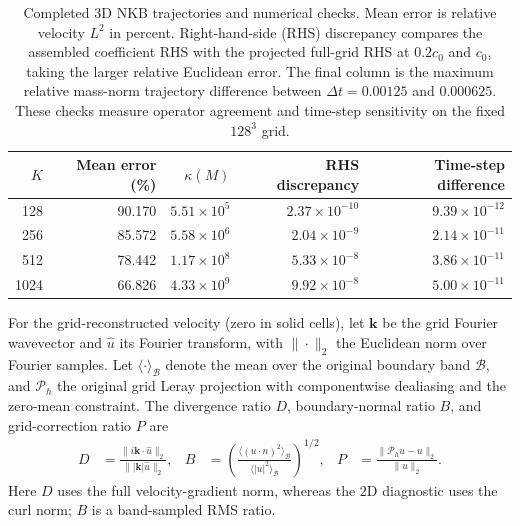 \begin{table}[!htb]
\centering\small
\caption{Completed 3D NKB trajectories and numerical checks. Mean error is relative velocity $L^2$ in percent. Right-hand-side (RHS) discrepancy compares the assembled coefficient RHS with the projected full-grid RHS at $0.2c_0$ and $c_0$, taking the larger relative Euclidean error. The final column is the maximum relative mass-norm trajectory difference between $\Delta t=0.00125$ and $0.000625$. These checks measure operator agreement and time-step sensitivity on the fixed $128^3$ grid.}
\label{tab:nkb-3d-checks}
\begin{tabular}{rrrrr}\toprule
$K$&Mean error (\%)&$\kappa(M)$&RHS discrepancy&Time-step difference\\\midrule
128&90.170&$5.51\times10^{5}$&$2.37\times10^{-10}$&$9.39\times10^{-12}$\\
256&85.572&$5.58\times10^{6}$&$2.04\times10^{-9}$&$2.14\times10^{-11}$\\
512&78.442&$1.17\times10^{8}$&$5.33\times10^{-8}$&$3.86\times10^{-11}$\\
1024&66.826&$4.33\times10^{9}$&$9.92\times10^{-8}$&$5.00\times10^{-11}$\\
\bottomrule\end{tabular}
\end{table}

For the grid-reconstructed velocity (zero in solid cells), let $\mathbf k$ be the grid Fourier wavevector and $\widehat u$ its Fourier transform, with $\|\cdot\|_2$ the Euclidean norm over Fourier samples. Let $\langle\cdot\rangle_{\mathcal B}$ denote the mean over the original boundary band $\mathcal B$, and $\mathcal P_h$ the original grid Leray projection with componentwise dealiasing and the zero-mean constraint. The divergence ratio $D$, boundary-normal ratio $B$, and grid-correction ratio $P$ are
\begin{align*}
D&=\frac{\|i\mathbf k\cdot\widehat u\|_2}{\||\mathbf k|\widehat u\|_2},&
B&=\left(\frac{\langle(u\cdot n)^2\rangle_{\mathcal B}}{\langle|u|^2\rangle_{\mathcal B}}\right)^{1/2},&
P&=\frac{\|\mathcal P_hu-u\|_2}{\|u\|_2}.
\end{align*}
Here $D$ uses the full velocity-gradient norm, whereas the 2D diagnostic uses the curl norm; $B$ is a band-sampled RMS ratio.

